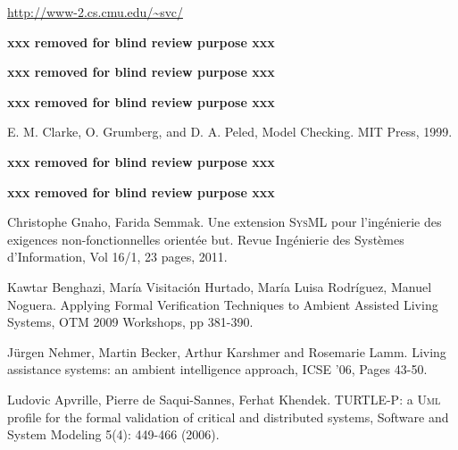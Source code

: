 \documentclass[a4paper,twoside]{article}
\def\myrelax{\textsc{Relax}}                  %
\def\sysml{\textsc{SysML}}
\def\UML{\textsc{Uml}}
\def\uml{\textsc{Uml}}
\newcommand{\final}[1]{\textbf{xxx removed for blind review purpose xxx}}
\begin{document}
\begin{thebibliography}{1}

\url{http://www-2.cs.cmu.edu/~svc/}

\final{Iulia Dragomir, Iulian Ober and David Lesens. A Case Study in Formal System Engineering with SysML, ICECCS 2012,Pages: 189 - 198.}

 \final{Iulian Ober and Iulia Dragomir. OMEGA2: A new version of the profile and the tools, ICECCS 2010,
DOI 10.1109/ICECCS.2010.59.}

  \final{Iulian Ober, Susanne Graf and Ileana Ober. Validating timed \uml{} models by simulation and verification, International Journal on Software Tools for Technology (2006) 8(2): 128–145}

E. M. Clarke, O. Grumberg, and D. A. Peled, Model Checking. MIT Press, 1999.

 \final{Jon Whittle, Pete Sawyer, Nelly Bencomo, Betty H.C. Cheng, and Jean-Michel Bruel. \myrelax{} : Incorporating Uncertainty into the Speciﬁcation of Self-Adaptive systems,RE Conference 2009, Pages: 79-88.}

 \final{Manzoor Ahmad, Jean Michel Bruel, R\'egine Laleau and Christophe Gnaho. Using RELAX, SysML and KAOS for Ambient Systems Requirements Modeling, Procedia Computer Science Volume 10, 2012, Pages 474–481.}

 Christophe Gnaho, Farida Semmak. Une extension \sysml{} pour l'ing\'enierie des exigences non-fonctionnelles orient\'ee but. Revue Ing\'enierie des Syst\`emes d'Information, Vol 16/1, 23 pages, 2011.

 Kawtar Benghazi, Mar\'ia Visitaci\'on Hurtado, Mar\'ia Luisa Rodr\'iguez, Manuel Noguera. Applying Formal Verification Techniques to Ambient Assisted Living Systems, OTM 2009 Workshops, pp 381-390.

 J\"urgen Nehmer, Martin Becker, Arthur Karshmer and Rosemarie Lamm. Living assistance systems: an ambient intelligence approach, ICSE '06, Pages 43-50. 


 Ludovic Apvrille, Pierre de Saqui-Sannes, Ferhat Khendek. TURTLE-P: a \UML{} profile for the formal validation of critical and distributed systems, Software and System Modeling 5(4): 449-466 (2006).


\end{thebibliography}
\end{document}
